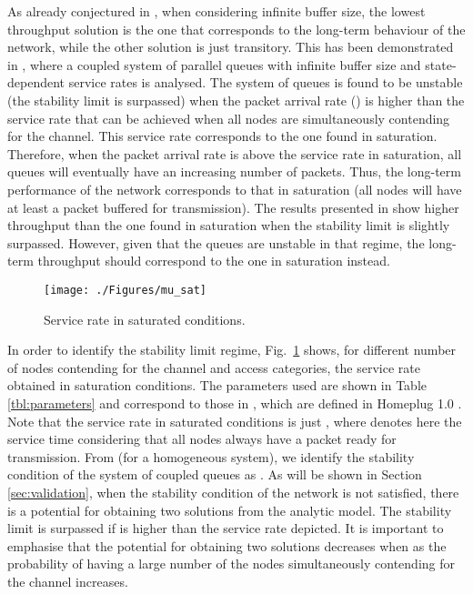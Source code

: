 \documentclass[preprint,12pt]{elsarticle}
\begin{document}
As already conjectured in \cite{Duffy2010}, when considering infinite buffer size, the lowest throughput solution is the one that corresponds to the long-term behaviour of the network, while the other solution is just transitory. This has been demonstrated in \cite{borst2008stability}, where a coupled system of parallel queues with infinite buffer size and state-dependent service rates is analysed. The system of queues is found to be unstable (the stability limit is surpassed) when the packet arrival rate () is higher than the service rate that can be achieved when all nodes are simultaneously contending for the channel. This service rate corresponds to the one found in saturation. Therefore, when the packet arrival rate is above the service rate in saturation, all queues will eventually have an increasing number of packets. Thus, the long-term performance of the network corresponds to that in saturation (all nodes will have at least a packet buffered for transmission). The results presented in \cite{chung2006performance} show higher throughput than the one found in saturation when the stability limit is slightly surpassed. However, given that the queues are unstable in that regime, the long-term throughput should correspond to the one in saturation instead.   



\begin{figure}[!hhhhtb]
\centering
\texttt{[image: ./Figures/mu\_sat]}
\caption{Service rate in saturated conditions.}
\label{fig:mu_sat}
\end{figure}

In order to identify the stability limit regime, Fig.~\ref{fig:mu_sat} shows, for different number of nodes contending for the channel and access categories, the service rate obtained in saturation conditions. The parameters used are shown in Table \ref{tbl:parameters} and correspond to those in \cite{chung2006performance}, which are defined in Homeplug 1.0 \cite{HomeplugStd}. Note that the service rate in saturated conditions is just , where  denotes here the service time considering that all nodes always have a packet ready for transmission. From \cite{borst2008stability} (for a homogeneous system), we identify the stability condition of the system of coupled queues as . As will be shown in Section \ref{sec:validation}, when the stability condition of the network is not satisfied, there is a potential for obtaining two solutions from the analytic model. The stability limit is surpassed if  is higher than the service rate depicted. It is important to emphasise that the potential for obtaining two solutions decreases when  as the probability of having a large number of the nodes simultaneously contending for the channel increases.
\end{document}
